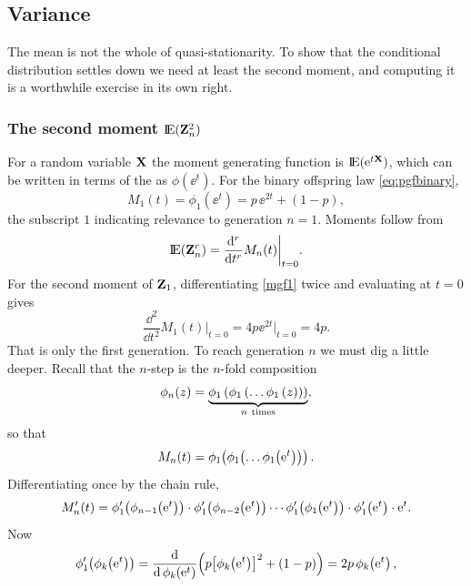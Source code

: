 \subsection{Variance}
\label{sec:variance}

The mean is not the whole of quasi-stationarity. To show that the conditional
distribution settles down we need at least the second moment, and computing it is a
worthwhile exercise in its own right.

\subsubsection{The second moment ${\rm I}\!{\rm E}({\bf Z}_n^2)$}

For a random variable ${\bf X}$ the moment generating function is ${\rm I}\!{\rm E}({\rm e}^{t{\bf X}})$, which
can be written in terms of the \pgf{} as $\phi(\ee^t)$. For the binary offspring law
\cref{eq:pgfbinary},
\begin{equation}
\label{mgf1}
M_1(t) = \phi_1(\ee^t) = p\,\ee^{2t} + (1-p),
\end{equation}
the subscript $1$ indicating relevance to generation $n=1$. Moments follow from
\begin{equation}
\label{mgf2}
{\rm I}\!{\rm E}({\bf Z}_n^r) = \frac{{\rm d}^r}{{\rm d} t^r}M_n(t)\bigg|_{t=0}.
\end{equation}
For the second moment of ${\bf Z}_1$, differentiating \cref{mgf1} twice and evaluating at
$t=0$ gives
\begin{equation*}
\frac{\dd^2}{\dd t^2}M_1(t)\bigg|_{t=0} = 4p\ee^{2t}\big|_{t=0} = 4p.
\end{equation*}
That is only the first generation. To reach generation $n$ we must dig a little deeper.
Recall that the $n$-step \pgf{} is the $n$-fold composition
\begin{equation*}
\phi_n(z) = \underset{n\ \text{times}}{\underbrace{\phi_1\lrb{\phi_1\lrb{\dots\phi_1\lrb{z}}}}},
\end{equation*}
so that
\begin{equation*}
M_n(t) = \phi_1\hspace{-2pt}\left(\phi_1\hspace{-2pt}\left(\dots\phi_1\hspace{-2pt}\left({\rm e}^t\right)\right)\right).
\end{equation*}
Differentiating once by the chain rule,
\begin{equation}
\label{dmgf1}
M_n'(t) = \phi_1'\hspace{-2pt}\left(\phi_{n-1}\hspace{-2pt}\left({\rm e}^t\right)\right)\cdot\phi_1'\hspace{-2pt}\left(\phi_{n-2}\hspace{-2pt}\left({\rm e}^t\right)\right)\cdots\phi_1'\hspace{-2pt}\left(\phi_{1}\hspace{-2pt}\left({\rm e}^t\right)\right)\cdot\phi_1'\hspace{-2pt}\left({\rm e}^t\right)\cdot{\rm e}^t .
\end{equation}
Now
\begin{equation*}
\phi_1'\hspace{-2pt}\left(\phi_k\hspace{-2pt}\left({\rm e}^t\right)\right)
= \frac{{\rm d}}{{\rm d}\,\phi_k\hspace{-2pt}\left({\rm e}^t\right)}\Bigl(p\bigl[\phi_k\hspace{-2pt}\left({\rm e}^t\right)\bigr]^2 + (1-p)\Bigr)
= 2p\,\phi_k\hspace{-2pt}\left({\rm e}^t\right),
\end{equation*}
